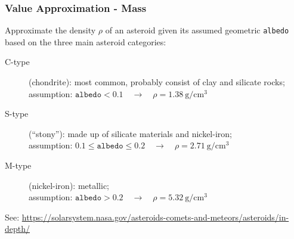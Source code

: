 \begin{frame}
    \frametitle{Value Approximation - Mass}
    Approximate the density $\rho$ of an asteroid given its assumed geometric \texttt{albedo} based on the three main asteroid categories: 
    \begin{description}
        \item[C-type] (chondrite): most common, probably consist of clay and silicate rocks; \\
        assumption: $\texttt{albedo} < \num{0.1} \quad\rightarrow\quad \rho = \SI{1.38}{\gram\per\cm^3}$ 
        \item[S-type] (\enquote{stony}): made up of silicate materials and nickel-iron;\\
        assumption: $\num{0.1} \leq \texttt{albedo} \leq \num{0.2} \quad\rightarrow\quad \rho = \SI{2.71}{\gram\per\cm^3}$ 
        \item[M-type] (nickel-iron): metallic;\\
        assumption: $\texttt{albedo} > \num{0.2} \quad\rightarrow\quad \rho = \SI{5.32}{\gram\per\cm^3}$ 
    \end{description}
    \vfill
    \btVFill
    \setfontsize{8pt}
    See: \url{https://solarsystem.nasa.gov/asteroids-comets-and-meteors/asteroids/in-depth/}
\end{frame}
